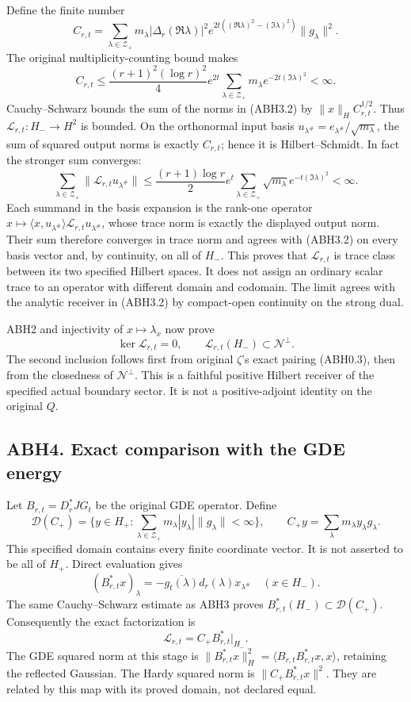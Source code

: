 Define the finite number \[
C_{r,t}=\sum_{\lambda\in\mathscr Z_+}
m_\lambda|\Delta_r(\Re\lambda)|^2
e^{2t((\Re\lambda)^2-(\Im\lambda)^2)}\|g_\lambda\|^2.
\tag{ABH3.4}
\] The original multiplicity-counting bound makes \[
C_{r,t}\le
\frac{(r+1)^2(\log r)^2}{4}e^{2t}
\sum_{\lambda\in\mathscr Z_+}m_\lambda e^{-2t(\Im\lambda)^2}<\infty.
\] Cauchy--Schwarz bounds the sum of the norms in (ABH3.2) by
\(\|x\|_H C_{r,t}^{1/2}\). Thus \(\mathcal L_{r,t}:H_-\to H^2\) is
bounded. On the orthonormal input basis
\(u_{\lambda^\#}=e_{\lambda^\#}/\sqrt{m_\lambda}\), the sum of squared
output norms is exactly \(C_{r,t}\); hence it is Hilbert--Schmidt. In
fact the stronger sum converges: \[
\sum_{\lambda\in\mathscr Z_+}\|\mathcal L_{r,t}u_{\lambda^\#}\|
\le\frac{(r+1)\log r}{2}e^t
\sum_{\lambda\in\mathscr Z_+}\sqrt{m_\lambda}e^{-t(\Im\lambda)^2}<\infty.
\tag{ABH3.6}
\] Each summand in the basis expansion is the rank-one operator
\(x\mapsto\langle x,u_{\lambda^\#}\rangle\mathcal L_{r,t}u_{\lambda^\#}\),
whose trace norm is exactly the displayed output norm. Their sum
therefore converges in trace norm and agrees with (ABH3.2) on every
basis vector and, by continuity, on all of \(H_-\). This proves that
\(\mathcal L_{r,t}\) is trace class between its two specified Hilbert
spaces. It does not assign an ordinary scalar trace to an operator with
different domain and codomain. The limit agrees with the analytic
receiver in (ABH3.2) by compact-open continuity on the strong dual.

ABH2 and injectivity of \(x\mapsto\lambda_x\) now prove \[
\ker\mathcal L_{r,t}=0,\qquad
\mathcal L_{r,t}(H_-)\subset\mathcal N^\perp.
\tag{ABH3.5}
\] The second inclusion follows first from original \(\zeta\)'s exact
pairing (ABH0.3), then from the closedness of \(\mathcal N^\perp\). This
is a faithful positive Hilbert receiver of the specified actual boundary
sector. It is not a positive-adjoint identity on the original \(Q\).

\subsection{ABH4. Exact comparison with the GDE
energy}\label{abh4.-exact-comparison-with-the-gde-energy}

Let \(B_{r,t}=D_r^*JG_t\) be the original GDE operator. Define \[
\mathcal D(C_+)=
\{y\in H_+:\sum_{\lambda\in\mathscr Z_+}
m_\lambda|y_\lambda|\|g_\lambda\|<\infty\},\qquad
C_+y=\sum_\lambda m_\lambda y_\lambda g_\lambda.
\tag{ABH4.1}
\] This specified domain contains every finite coordinate vector. It is
not asserted to be all of \(H_+\). Direct evaluation gives \[
(B_{r,t}^*x)_\lambda
=-\overline{g_t(\lambda)}d_r(\lambda)x_{\lambda^\#}
\quad(x\in H_-).
\] The same Cauchy--Schwarz estimate as ABH3 proves
\(B_{r,t}^*(H_-)\subset\mathcal D(C_+)\). Consequently the exact
factorization is \[
\boxed{\mathcal L_{r,t}=C_+B_{r,t}^*|_{H_-}.}
\tag{ABH4.2}
\] The GDE squared norm at this stage is
\(\|B_{r,t}^*x\|_H^2=\langle B_{r,t}B_{r,t}^*x,x\rangle\), retaining the
reflected Gaussian. The Hardy squared norm is \(\|C_+B_{r,t}^*x\|^2\).
They are related by this map with its proved domain, not declared equal.


